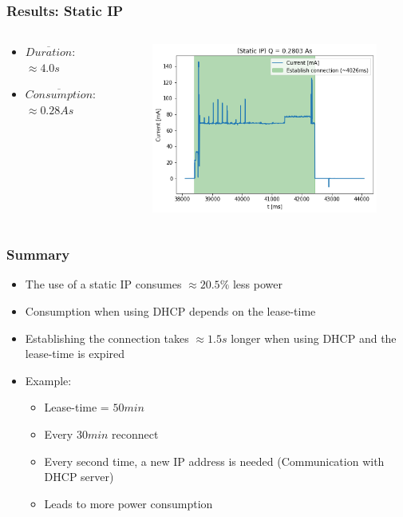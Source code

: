 \begin{frame}
    \frametitle{Results: Static IP}
    \begin{columns}
        \begin{column}{0.35\textwidth}
            \begin{itemize}
                \item $\overline{Duration}$: $\approx4.0s$
                \item $\overline{Consumption}$: $\approx0.28As$
            \end{itemize}
        \end{column}
        \begin{column}{0.65\textwidth}
            \begin{figure}
                \includegraphics[scale=0.5]{../paper/fig/static_ip.png}
            \end{figure}
        \end{column}
    \end{columns}
\end{frame}

\begin{frame}
    \frametitle{Summary}

    \begin{itemize}

        \item The use of a static IP consumes $\approx 20.5\%$ less power
        \item Consumption when using DHCP depends on the lease-time
        \item Establishing the connection takes $\approx 1.5s$ longer when using DHCP and the lease-time is expired
        \item Example: \begin{itemize}
                  \item Lease-time = $50min$
                  \item Every $30min$ reconnect
                  \item Every second time, a new IP address is needed (Communication with DHCP server)
                  \item Leads to more power consumption
              \end{itemize}
    \end{itemize}


\end{frame}
